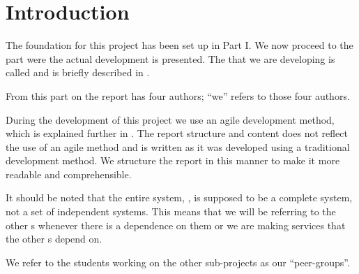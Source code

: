 \chapter{Introduction}
\label{chap:introProjectgroup}
The foundation for this project has been set up in Part I.
We now proceed to the part were the actual development is presented.
The \subsystem{} that we are developing is called \administrationgroup{} and is briefly described in .



From this part on the report has four authors; ``we'' refers to those four authors.

During the development of this project we use an agile development method, which is explained further in . 
The report structure and content does not reflect the use of an agile method and is written as it was developed using a traditional development method. 
We structure the report in this manner to make it more readable and comprehensible. 

It should be noted that the entire system, \system{}, is supposed to be a complete system, not a set of independent systems.
This means that we will be referring to the other \subsystem{}s whenever there is a dependence on them or we are making services that the other \subsystem{}s depend on.

We refer to the students working on the other sub-projects as our ``peer-groups''.


